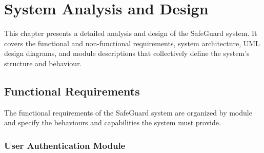 \chapter{System Analysis and Design}

This chapter presents a detailed analysis and design of the SafeGuard system. It covers the functional and non-functional requirements, system architecture, UML design diagrams, and module descriptions that collectively define the system's structure and behaviour.

\section{Functional Requirements}

The functional requirements of the SafeGuard system are organized by module and specify the behaviours and capabilities the system must provide.

\subsection{User Authentication Module}

